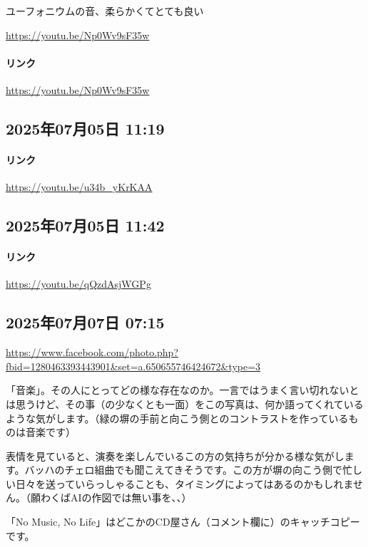 ユーフォニウムの音、柔らかくてとても良い

\url{https://youtu.be/Np0Wv9sF35w}

\paragraph{リンク}
\url{https://youtu.be/Np0Wv9sF35w}

\subsection*{2025年07月05日 11:19}

\paragraph{リンク}
\url{https://youtu.be/u34b_yKrKAA}

\subsection*{2025年07月05日 11:42}

\paragraph{リンク}
\url{https://youtu.be/qQzdAsjWGPg}

\subsection*{2025年07月07日 07:15}

\url{https://www.facebook.com/photo.php?fbid=1280463393443901&set=a.650655746424672&type=3}

「音楽」。その人にとってどの様な存在なのか。一言ではうまく言い切れないとは思うけど、その事（の少なくとも一面）をこの写真は、何か語ってくれているような気がします。（緑の塀の手前と向こう側とのコントラストを作っているものは音楽です）

表情を見ていると、演奏を楽しんでいるこの方の気持ちが分かる様な気がします。バッハのチェロ組曲でも聞こえてきそうです。この方が塀の向こう側で忙しい日々を送っていらっしゃることも、タイミングによってはあるのかもしれません。（願わくばAIの作図では無い事を、、）

「No Music, No Life」はどこかのCD屋さん（コメント欄に）のキャッチコピーです。

